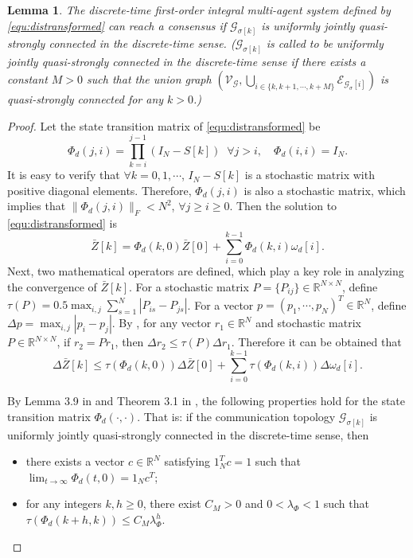 \documentclass[12pt,draftcls,onecolumn]{IEEEtran}
\newtheorem{lem}{Lemma}
\begin{document}
\begin{lem}\label{lem2}
The discrete-time first-order integral multi-agent system defined by \eqref{equ:distransformed} can reach a consensus if
$\mathcal{G}_{\sigma[k]}$ is uniformly jointly quasi-strongly connected in the discrete-time sense.
($\mathcal{G}_{\sigma[k]}$ is called to be uniformly jointly quasi-strongly connected in the discrete-time sense if there exists a constant $M>0$ such that the union graph $(\mathcal{V}_\mathcal{G}, \bigcup_{i\in\{k,k+1,\cdots,k+M\}}\mathcal{E}_{\mathcal{G}_\sigma[i]})$ is quasi-strongly connected for any $k>0$.)
\end{lem}
\begin{proof}
Let the state transition matrix of \eqref{equ:distransformed} be
\begin{equation}\label{equ:distransitionmatrix}
\Phi_d(j,i) = \prod^{j-1}_{k=i}(I_N - S[k])\;\; \forall j>i, \quad \Phi_d(i,i) = I_N.
\end{equation}
It is easy to verify that $\forall k=0,1,\cdots$, $I_N-S[k]$ is a stochastic matrix with positive diagonal elements. Therefore, $\Phi_d(j,i)$ is also a stochastic matrix, which implies that $\|\Phi_d(j,i)\|_F < N^2$, $\forall j \geq i \geq 0$. Then the solution to \eqref{equ:distransformed} is
\begin{equation}\label{equ:distransitionmatrix}
\bar{Z}[k] = \Phi_d(k,0)\bar{Z}[0] + \sum^{k-1}_{i=0}\Phi_d(k,i)\omega_d[i].
\end{equation}
Next, two mathematical operators are defined, which play a key role in analyzing the convergence of $\bar{Z}[k]$. For a stochastic matrix $P=\{P_{ij}\} \in \mathbb{R}^{N\times N}$, define $\tau(P) = 0.5\max_{i,j}\sum^N_{s=1}|P_{is} - P_{js}|$. For a vector $p = (p_1,\cdots,p_N)^T \in \mathbb{R}^{N}$, define $\Delta p = \max_{i,j}|p_i-p_j|$. By \cite{Seneta81Book}, for any vector $r_1\in \mathbb{R}^N$ and stochastic matrix $P \in \mathbb{R}^{N\times N}$, if $r_2 = Pr_1$, then $\Delta r_2 \leq \tau(P)\Delta r_1$. Therefore it can be obtained that
\begin{equation}
\Delta\bar{Z}[k] \leq \tau(\Phi_d(k,0))\Delta\bar{Z}[0] + \sum^{k-1}_{i=0}\tau(\Phi_d(k,i))\Delta\omega_d[i].
\end{equation}

By Lemma 3.9 in \cite{Ren05TAC} and Theorem 3.1 in \cite{Wang09SIC}, the following properties hold for the state transition matrix $\Phi_d(\cdot,\cdot)$. That is: if the communication topology $\mathcal{G}_{\sigma[k]}$ is uniformly jointly quasi-strongly connected in the discrete-time sense, then
\begin{itemize}
\item there exists a vector $c \in \mathbb{R}^N$ satisfying $1^T_Nc = 1$ such that $\lim_{t\to\infty}\Phi_d(t,0) = 1_Nc^T$;
\item for any integers $k, h \geq 0$, there exist $C_M > 0$ and $0 < \lambda_{\Phi} < 1$ such that $\tau(\Phi_d(k+h,k)) \leq C_M\lambda^h_{\Phi}$.
\end{itemize}


\end{proof}
\end{document}
